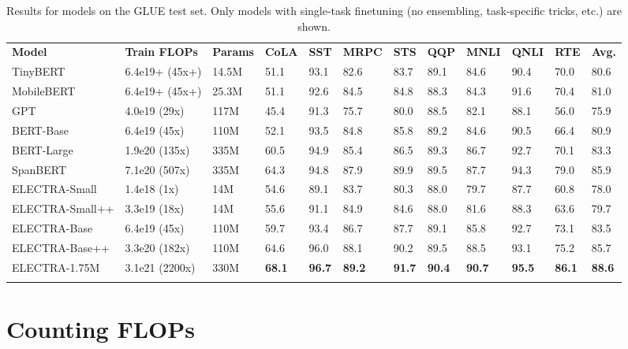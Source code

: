 \documentclass{article}
\newcommand\tstrut{\rule{0pt}{2.6ex}}
\newcommand\bstrut{\rule[-1.0ex]{0pt}{0pt}}
\newcommand{\thinline}{\Xhline{1.5\arrayrulewidth}}
\newcommand{\thickline}{\Xhline{2.5\arrayrulewidth}}
\newcommand{\tsep}	{\bstrut \\ \thinline}
\newcommand{\ttop}{\thickline}
\newcommand{\tbottom}{\bstrut \\ \thickline}
\begin{document}
\addtolength{\tabcolsep}{-4pt}
\begin{table}[t!]
\small
\begin{center}
\begin{tabularx}{\linewidth}{X l l l l l l l l l l l}
\ttop 
\textbf{Model} & \textbf{Train FLOPs} & \textbf{Params} & \textbf{CoLA} & \textbf{SST} & \textbf{MRPC} & \textbf{STS} & \textbf{QQP} & \textbf{MNLI} & \textbf{QNLI} & \textbf{RTE} & \textbf{Avg.} \tstrut \tsep 
TinyBERT &  6.4e19+ (45x+)  & 14.5M  & 51.1 & 93.1 & 82.6 & 83.7 & 89.1 & 84.6 & 90.4 & 70.0 & 80.6 \tstrut \\
MobileBERT &  6.4e19+ (45x+)  & 25.3M  & 51.1 & 92.6 & 84.5 & 84.8 & 88.3 & 84.3 & 91.6 & 70.4 & 81.0  \\
GPT &  4.0e19 (29x)  & 117M  & 45.4 & 91.3 & 75.7 & 80.0 & 88.5 & 82.1 & 88.1 & 56.0 & 75.9 \\
BERT-Base  &  6.4e19 (45x)  & 110M  & 52.1 & 93.5 & 84.8 & 85.8 & 89.2 & 84.6 & 90.5 & 66.4 & 80.9 \\
BERT-Large &  1.9e20 (135x)  & 335M  & 60.5 & 94.9 & 85.4 & 86.5 & 89.3 & 86.7 & 92.7 & 70.1 & 83.3 \\
SpanBERT      &  7.1e20 (507x)  & 335M  & 64.3 & 94.8 & 87.9 & 89.9 & 89.5 & 87.7 & 94.3 & 79.0 & 85.9 \tsep
ELECTRA-Small &  1.4e18 (1x) & 14M  & 54.6 & 89.1 & 83.7 & 80.3 & 88.0 & 79.7 & 87.7 & 60.8 & 78.0  \tstrut \\
ELECTRA-Small++ &  3.3e19 (18x) & 14M  & 55.6 & 91.1 & 84.9 & 84.6 & 88.0 & 81.6 & 88.3 & 63.6 & 79.7  \\
ELECTRA-Base &  6.4e19 (45x) & 110M    & 59.7 & 93.4 & 86.7 & 87.7 & 89.1 & 85.8 & 92.7 & 73.1 & 83.5 \\
ELECTRA-Base++ &  3.3e20 (182x) & 110M    & 64.6 & 96.0 & 88.1 & 90.2 & 89.5 & 88.5 & 93.1 & 75.2 & 85.7 \\
ELECTRA-1.75M &  3.1e21 (2200x) & 330M    & \textbf{68.1} & \textbf{96.7} & \textbf{89.2} & \textbf{91.7} & \textbf{90.4} & \textbf{90.7} & \textbf{95.5} & \textbf{86.1} & \textbf{88.6}
\tbottom
\end{tabularx} 
\end{center}
\vspace{-1mm}
\caption{Results for models on the GLUE test set. Only models with single-task finetuning (no ensembling, task-specific tricks, etc.) are shown.}
\label{tab:basetest}
\end{table}
\addtolength{\tabcolsep}{4pt}
\vspace{-1mm}

\section{Counting FLOPs}
\label{app:flops}
\end{document}
